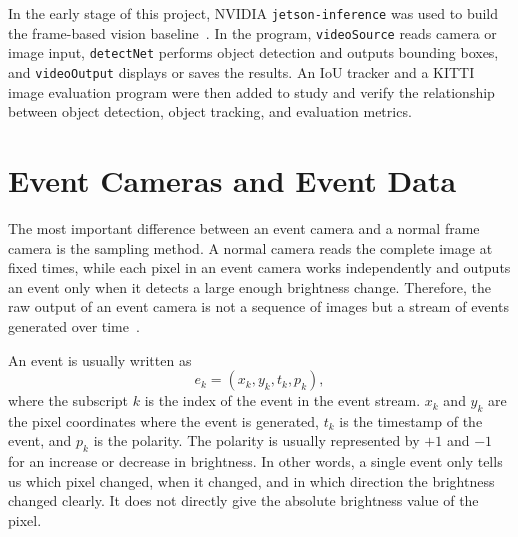 In the early stage of this project, NVIDIA \texttt{jetson-inference} was used to build the frame-based vision baseline~\parencite{jetsonInference}. In the program, \texttt{videoSource} reads camera or image input, \texttt{detectNet} performs object detection and outputs bounding boxes, and \texttt{videoOutput} displays or saves the results. An IoU tracker and a KITTI image evaluation program were then added to study and verify the relationship between object detection, object tracking, and evaluation metrics.

\section{Event Cameras and Event Data}

The most important difference between an event camera and a normal frame camera is the sampling method. A normal camera reads the complete image at fixed times, while each pixel in an event camera works independently and outputs an event only when it detects a large enough brightness change. Therefore, the raw output of an event camera is not a sequence of images but a stream of events generated over time~\parencite{gallego2022}.

An event is usually written as
\begin{equation}
e_k=(x_k,y_k,t_k,p_k),
\end{equation}
where the subscript $k$ is the index of the event in the event stream. $x_k$ and $y_k$ are the pixel coordinates where the event is generated, $t_k$ is the timestamp of the event, and $p_k$ is the polarity. The polarity is usually represented by $+1$ and $-1$ for an increase or decrease in brightness. In other words, a single event only tells us which pixel changed, when it changed, and in which direction the brightness changed clearly. It does not directly give the absolute brightness value of the pixel.

